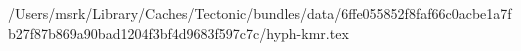 /Users/msrk/Library/Caches/Tectonic/bundles/data/6ffe055852f8faf66c0acbe1a7fb27f87b869a90bad1204f3bf4d9683f597c7c/hyph-kmr.tex
